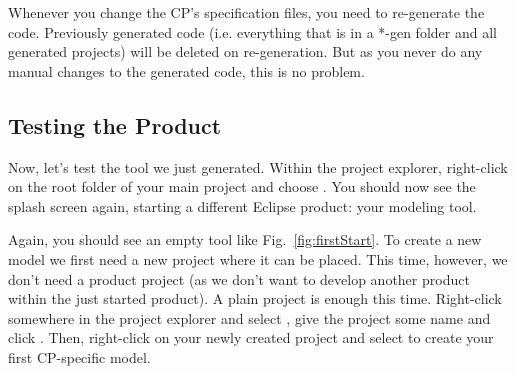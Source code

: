 \documentclass[a4paper,american,12pt]{scrreprt}
\begin{document}
Whenever you change the CP's specification files, you need to re-generate the
code. Previously generated code (i.e. everything that is in a *-gen folder and
all generated projects) will be deleted on re-generation. But as you never do
any manual changes to the generated code, this is no problem. 

\subsection{Testing the \cinco Product} \label{sec:testing}

Now, let's test the tool we just generated. Within the project explorer,
right-click on the root folder of your main project and choose . You should now see the \cinco splash screen again,
starting a different Eclipse product: your modeling tool. \footnotemark


Again, you should see an empty tool like Fig.~\ref{fig:firstStart}. To create a
new model we first need a new project where it can be placed. This time,
however, we don't need a \cinco product project (as we don't want to develop
another \cinco product within the just started \cinco product). A plain project
is enough this time. Right-click somewhere in the project explorer and select
, give the project some name
and click . Then, right-click on your newly created project and
select  to create your
first CP-specific model.
\end{document}
